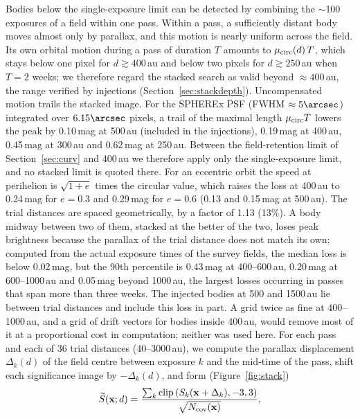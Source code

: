 \documentclass[twocolumn,linenumbers,anonymous]{aastex702}
\begin{document}
Bodies below the single-exposure limit can be detected by combining the $\sim$100 exposures of a field within one pass. Within a pass, a sufficiently distant body moves almost only by parallax, and this motion is nearly uniform across the field. Its own orbital motion during a pass of duration $T$ amounts to $\mu_{\rm circ}(d)\,T$, which stays below one pixel for $d \gtrsim 400$\,au and below two pixels for $d \gtrsim 250$\,au when $T = 2$ weeks; we therefore regard the stacked search as valid beyond $\approx 400$\,au, the range verified by injections (Section~\ref{sec:stackdepth}). Uncompensated motion trails the stacked image. For the SPHEREx PSF (FWHM $\approx 5\arcsec$) integrated over $6.15\arcsec$ pixels, a trail of the maximal length $\mu_{\rm circ}T$ lowers the peak by 0.10\,mag at 500\,au (included in the injections), 0.19\,mag at 400\,au, 0.45\,mag at 300\,au and 0.62\,mag at 250\,au. Between the field-retention limit of Section~\ref{sec:curv} and 400\,au we therefore apply only the single-exposure limit, and no stacked limit is quoted there. For an eccentric orbit the speed at perihelion is $\sqrt{1+e}$ times the circular value, which raises the loss at 400\,au to 0.24\,mag for $e = 0.3$ and 0.29\,mag for $e = 0.6$ (0.13 and 0.15\,mag at 500\,au). The trial distances are spaced geometrically, by a factor of 1.13 (13\%). A body midway between two of them, stacked at the better of the two, loses peak brightness because the parallax of the trial distance does not match its own; computed from the actual exposure times of the survey fields, the median loss is below 0.02\,mag, but the 90th percentile is 0.43\,mag at 400--600\,au, 0.20\,mag at 600--1000\,au and 0.05\,mag beyond 1000\,au, the largest losses occurring in passes that span more than three weeks. The injected bodies at 500 and 1500\,au lie between trial distances and include this loss in part. A grid twice as fine at 400--1000\,au, and a grid of drift vectors for bodies inside 400\,au, would remove most of it at a proportional cost in computation; neither was used here. For each pass and each of 36 trial distances (40--3000\,au), we compute the parallax displacement $\Delta_k(d)$ of the field centre between exposure $k$ and the mid-time of the pass, shift each significance image by $-\Delta_k(d)$, and form (Figure~\ref{fig:stack})
\begin{equation}
\widetilde{S}(\mathbf{x}; d) = \frac{\sum_k \mathrm{clip}\left(S_k(\mathbf{x} + \Delta_k), -3, 3\right)}{\sqrt{N_{\rm cov}(\mathbf{x})}},
\end{equation}
\end{document}
